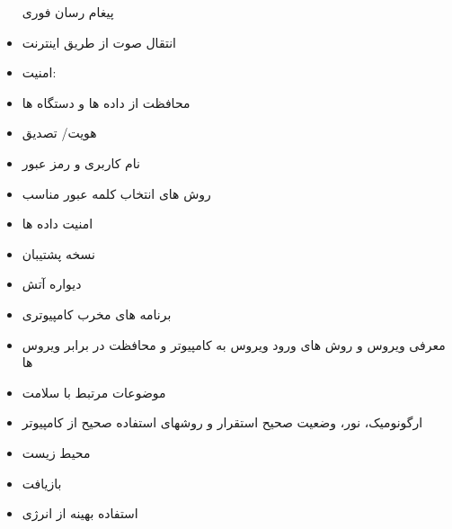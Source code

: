 \begin{itemize}
پیغام رسان فوری
\item
انتقال صوت از طریق اینترنت
\item
امنیت:
\item
محافظت از داده ها و دستگاه ها
\item
هویت/ تصدیق
\item
نام کاربری و رمز عبور
\item
روش های انتخاب کلمه عبور مناسب
\item
امنیت داده ها
\item
نسخه پشتیبان
\item
دیواره آتش
\item
برنامه های مخرب کامپیوتری
\item
معرفی ویروس و روش های ورود ویروس به کامپیوتر و محافظت در برابر ویروس ها
\item
موضوعات مرتبط با سلامت
\item
ارگونومیک، نور، وضعیت صحیح استقرار و روشهای استفاده صحیح از کامپیوتر
\item
محیط زیست
\item
بازیافت
\item
استفاده بهینه از انرژی
\end{itemize}